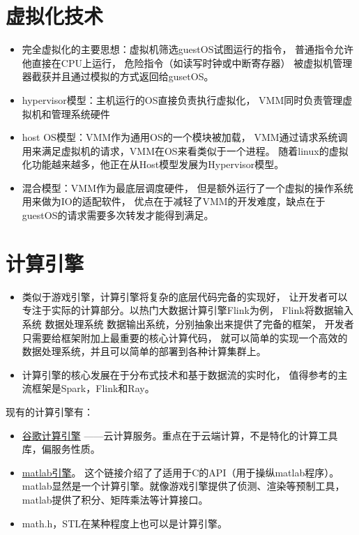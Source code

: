 \documentclass[AutoFakeBold,a4paper]{ctexart}
\begin{document}
\section{虚拟化技术}

\begin{itemize}
    \item 完全虚拟化的主要思想：虚拟机筛选guestOS试图运行的指令，
    普通指令允许他直接在CPU上运行，
    危险指令（如读写时钟或中断寄存器）
    被虚拟机管理器截获并且通过模拟的方式返回给gusetOS。
    \item hypervisor模型：主机运行的OS直接负责执行虚拟化，
    VMM同时负责管理虚拟机和管理系统硬件
    \item host OS模型：VMM作为通用OS的一个模块被加载，
    VMM通过请求系统调用来满足虚拟机的请求，VMM在OS来看类似于一个进程。
    随着linux的虚拟化功能越来越多，他正在从Host模型发展为Hypervisor模型。
    \item 混合模型：VMM作为最底层调度硬件，
    但是额外运行了一个虚拟的操作系统用来做为IO的适配软件，
    优点在于减轻了VMM的开发难度，缺点在于guestOS的请求需要多次转发才能得到满足。
\end{itemize}

\section{计算引擎}

\begin{itemize}
    \item 类似于游戏引擎，计算引擎将复杂的底层代码完备的实现好，
    让开发者可以专注于实际的计算部分。以热门大数据计算引擎Flink为例，
    Flink将数据输入系统 数据处理系统 数据输出系统，分别抽象出来提供了完备的框架，
    开发者只需要给框架附加上最重要的核心计算代码，
    就可以简单的实现一个高效的数据处理系统，并且可以简单的部署到各种计算集群上。
    \item 计算引擎的核心发展在于分布式技术和基于数据流的实时化，
    值得参考的主流框架是Spark，Flink和Ray。
\end{itemize}

现有的计算引擎有：

\begin{itemize}
    \item \href{https://zh.m.wikipedia.org/wiki/Google%E8%AE%A1%E7%AE%97%E5%BC%95%E6%93%8E}{谷歌计算引擎}
    ——云计算服务。重点在于云端计算，不是特化的计算工具库，偏服务性质。
    \item \href{https://zh.m.wikipedia.org/wiki/Google%E8%AE%A1%E7%AE%97%E5%BC%95%E6%93%8E}{matlab引擎}。
    这个链接介绍了了适用于C的API（用于操纵matlab程序）。
    matlab显然是一个计算引擎。就像游戏引擎提供了侦测、渲染等预制工具，
    matlab提供了积分、矩阵乘法等计算接口。
    \item math.h，STL在某种程度上也可以是计算引擎。
\end{itemize}



\end{document}
